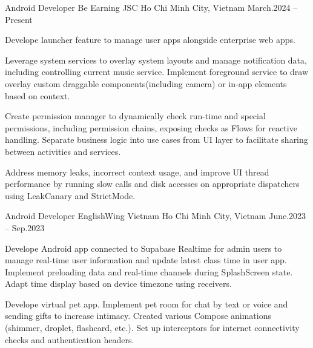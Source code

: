 \begin{cventries}

    \cventry
    {Android Developer}
    {Be Earning JSC}
    {Ho Chi Minh City, Vietnam}
    {March.2024 -- Present}
    {
        \begin{cvitems}
            \item {
                Develope launcher feature to manage user apps alongside enterprise web apps.
            }
            \item {
                Leverage system services to overlay system layouts and manage notification data, including controlling current music service.
                Implement foreground service to draw overlay custom draggable components(including camera) or in-app elements based on context.
            }
            \item {
                Create permission manager to dynamically check run-time and special permissions, including permission chains, exposing checks as Flows for reactive handling.
                Separate business logic into use cases from UI layer to facilitate sharing between activities and services.
            }
            \item {
                Address memory leaks, incorrect context usage, and improve UI thread performance by running slow calls and disk accesses on appropriate dispatchers using LeakCanary and StrictMode.
            }
        \end{cvitems}
    }

    \cventry
    {Android Developer}
    {EnglishWing Vietnam}
    {Ho Chi Minh City, Vietnam}
    {June.2023 -- Sep.2023}
    {
        \begin{cvitems}
            \item {
                Develope Android app connected to Supabase Realtime for admin users to manage real-time user information and update latest class time in user app.
                Implement preloading data and real-time channels during SplashScreen state.
                Adapt time display based on device timezone using receivers.
            }
            \item {
                Develope virtual pet app.
                Implement pet room for chat by text or voice and sending gifts to increase intimacy.
                Created various Compose animations (shimmer, droplet, flashcard, etc.).
                Set up interceptors for internet connectivity checks and authentication headers.
            }
        \end{cvitems}
    }

\end{cventries}
